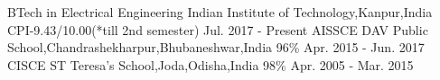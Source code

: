\begin{cventries}
  \cventry
    {BTech in Electrical Engineering}
    {Indian Institute of Technology,Kanpur,India}
    {CPI-9.43/10.00(*till 2nd semester)}
    {Jul. 2017 - Present}
    {
    }
   \cventry
    {AISSCE}
    {DAV Public School,Chandrashekharpur,Bhubaneshwar,India}
    {96\%}
    {Apr. 2015 - Jun. 2017}
    {
    }
    \cventry
    {CISCE}
    {ST Teresa's School,Joda,Odisha,India}
    {98\%}
    {Apr. 2005 - Mar. 2015}
    {
    }
 
\end{cventries}

